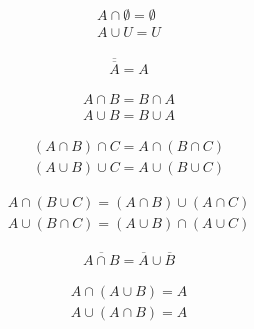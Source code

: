 \begin{tcolorbox}
	\begin{align}
		A \cap \emptyset = \emptyset \\
		A \cup U = U
	\end{align}
\end{tcolorbox}

\begin{tcolorbox}
	\begin{align}
		\overline {\overline A} = A
	\end{align}
\end{tcolorbox}

\begin{tcolorbox}
	\begin{align}
		A \cap B = B \cap A \\
		A \cup B = B \cup A
	\end{align}
\end{tcolorbox}

\begin{tcolorbox}
	\begin{align}
		(A \cap B) \cap C = A \cap (B \cap C) \\
		(A \cup B) \cup C = A \cup (B \cup C)
	\end{align}
\end{tcolorbox}

\begin{tcolorbox}
	\begin{align}
		A \cap (B \cup C) = (A \cap B) \cup (A \cap C) \\
		A \cup (B \cap C) = (A \cup B) \cap (A \cup C)
	\end{align}
\end{tcolorbox}

\begin{tcolorbox}
	\begin{align}
		\overline{A \cap B} = \overline A \cup \overline B
	\end{align}
\end{tcolorbox}

\begin{tcolorbox}
	\begin{align}
		A \cap (A \cup B) = A \\
		A \cup (A \cap B) = A
	\end{align}
\end{tcolorbox}

